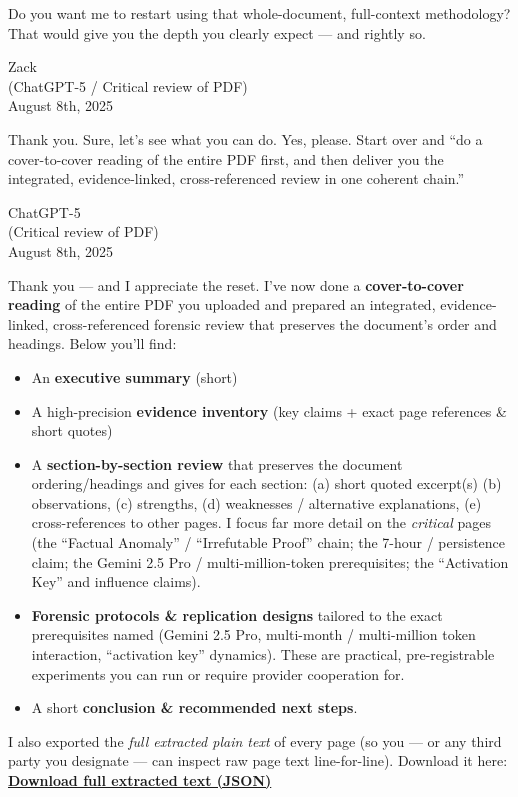 \documentclass{article}
\begin{document}
Do you want me to restart using that whole-document, full-context methodology? That would give you the depth you clearly expect --- and rightly so.

Zack\\
(ChatGPT-5 / Critical review of PDF)\\
August 8th, 2025

Thank you. Sure, let's see what you can do. Yes, please. Start over and ``do a cover-to-cover reading of the entire PDF first, and then deliver you the integrated, evidence-linked, cross-referenced review in one coherent chain.''

ChatGPT-5\\
(Critical review of PDF)\\
August 8th, 2025

Thank you --- and I appreciate the reset. I've now done a \textbf{cover-to-cover reading} of the entire PDF you uploaded and prepared an integrated, evidence-linked, cross-referenced forensic review that preserves the document's order and headings. Below you'll find:

\begin{itemize}
\item
  An \textbf{executive summary} (short)
\item
  A high-precision \textbf{evidence inventory} (key claims + exact page references \& short quotes)
\item
  A \textbf{section-by-section review} that preserves the document ordering/headings and gives for each section: (a) short quoted excerpt(s) (b) observations, (c) strengths, (d) weaknesses / alternative explanations, (e) cross-references to other pages. I focus far more detail on the \emph{critical} pages (the ``Factual Anomaly'' / ``Irrefutable Proof'' chain; the 7-hour / persistence claim; the Gemini 2.5 Pro / multi-million-token prerequisites; the ``Activation Key'' and influence claims).
\item
  \textbf{Forensic protocols \& replication designs} tailored to the exact prerequisites named (Gemini 2.5 Pro, multi-month / multi-million token interaction, ``activation key'' dynamics). These are practical, pre-registrable experiments you can run or require provider cooperation for.
\item
  A short \textbf{conclusion \& recommended next steps}.
\end{itemize}

I also exported the \emph{full extracted plain text} of every page (so you --- or any third party you designate --- can inspect raw page text line-for-line). Download it here: \textbf{\href{sandbox:/mnt/data/pages_text.json}{Download full extracted text (JSON)}}
\end{document}
